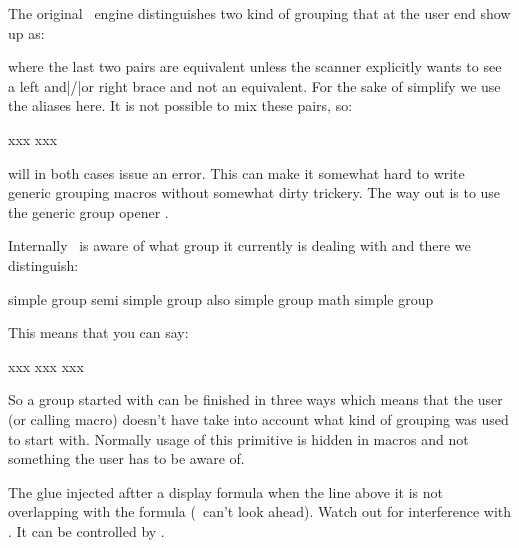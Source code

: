 \stopnewprimitive

\startnewprimitive[title={\prm {beginsimplegroup}}]

The original \TEX\ engine distinguishes two kind of grouping that at the user end
show up as:

\starttyping
\begingroup \endgroup
\bgroup \egroup { }
\stoptyping

where the last two pairs are equivalent unless the scanner explicitly wants to see a
left and|/|or right brace and not an equivalent. For the sake of simplify we use
the aliases here. It is not possible to mix these pairs, so:

\starttyping
\bgroup xxx\endgroup
\begingroup xxx\egroup
\stoptyping

will in both cases issue an error. This can make it somewhat hard to write generic
grouping macros without somewhat dirty trickery. The way out is to use the generic
group opener .

Internally \LUAMETATEX\ is aware of  what group it currently is dealing with and
there we distinguish:

\starttabulate[||||]
\NC simple group      \NC \type {\bgroup}           \NC \type {\egroup} \NC \NR
\NC semi simple group \NC \type {\begingroup}       \NC \type {\endgroup} \type {\endsimplegroup} \NC \NR
\NC also simple group \NC \type {\beginsimplegroup} \NC \type {\egroup} \type {\endgroup} \type {\endsimplegroup} \NC \NR
\NC math simple group \NC \type {\beginmathgroup}   \NC \type {\endmathgroup} \NC \NR
\stoptabulate

This means that you can say:

\starttyping
\beginsimplegroup xxx\endsimplegroup
\beginsimplegroup xxx\endgroup
\beginsimplegroup xxx\egroup
\stoptyping

So a group started with  can be finished in three ways
which means that the user (or calling macro) doesn't have take into account what
kind of grouping was used to start with. Normally usage of this primitive is
hidden in macros and not something the user has to be aware of.

\stopnewprimitive

\startoldprimitive[title={\prm {belowdisplayshortskip}}]

The glue injected aftter a display formula when the line above it is not
overlapping with the formula (\TEX\ can't look ahead). Watch out for interference
with . It can be controlled by .

